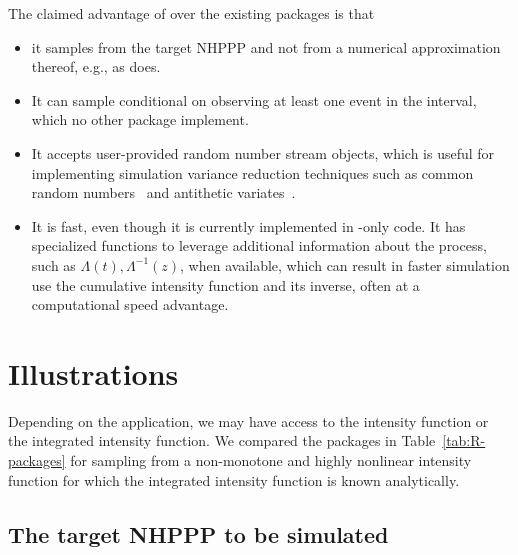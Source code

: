 \documentclass[article,nojss]{jss}\usepackage[]{graphicx}\usepackage[]{xcolor}
\begin{document}
The claimed advantage of  over the existing packages is that
\begin{itemize}
\item it samples from the target NHPPP and not from a numerical approximation thereof, e.g., as  does.
\item It can  sample conditional on observing at least one event in the interval, which no other package implement.
\item It accepts user-provided random number stream objects, which is useful for implementing simulation variance reduction techniques such as common random numbers~\citep{wright1979crn} and antithetic variates~\citep{hammersley1956av}.
\item It is fast, even though it is currently implemented in -only code. It has specialized functions to leverage additional information about the process, such as $\Lambda(t), \Lambda^{-1}(z)$, when available, which can result in faster simulation  use the cumulative intensity function and its inverse, often at a computational speed advantage.
\end{itemize}




\section{Illustrations} \label{sec:illustrations}

Depending on the application, we may have access to the intensity function
or the integrated intensity function.
We compared the  packages in Table~\ref{tab:R-packages} for sampling from a non-monotone and highly nonlinear intensity function for which the integrated intensity function is known analytically.

\subsection{The target NHPPP to be simulated}\label{sec:illustration-target}
\end{document}
